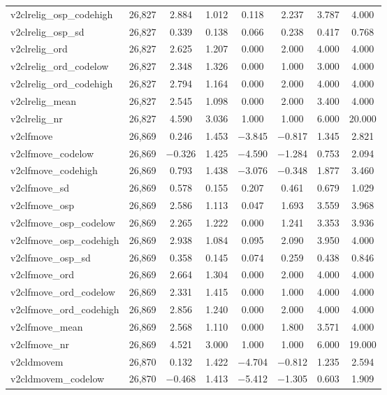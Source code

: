 \begin{table}[!htbp]
\begin{tabular}{@{\extracolsep{5pt}}lccccccc}
v2clrelig\_osp\_codehigh & 26,827 & 2.884 & 1.012 & 0.118 & 2.237 & 3.787 & 4.000 \\ 
v2clrelig\_osp\_sd & 26,827 & 0.339 & 0.138 & 0.066 & 0.238 & 0.417 & 0.768 \\ 
v2clrelig\_ord & 26,827 & 2.625 & 1.207 & 0.000 & 2.000 & 4.000 & 4.000 \\ 
v2clrelig\_ord\_codelow & 26,827 & 2.348 & 1.326 & 0.000 & 1.000 & 3.000 & 4.000 \\ 
v2clrelig\_ord\_codehigh & 26,827 & 2.794 & 1.164 & 0.000 & 2.000 & 4.000 & 4.000 \\ 
v2clrelig\_mean & 26,827 & 2.545 & 1.098 & 0.000 & 2.000 & 3.400 & 4.000 \\ 
v2clrelig\_nr & 26,827 & 4.590 & 3.036 & 1.000 & 1.000 & 6.000 & 20.000 \\ 
v2clfmove & 26,869 & 0.246 & 1.453 & $-$3.845 & $-$0.817 & 1.345 & 2.821 \\ 
v2clfmove\_codelow & 26,869 & $-$0.326 & 1.425 & $-$4.590 & $-$1.284 & 0.753 & 2.094 \\ 
v2clfmove\_codehigh & 26,869 & 0.793 & 1.438 & $-$3.076 & $-$0.348 & 1.877 & 3.460 \\ 
v2clfmove\_sd & 26,869 & 0.578 & 0.155 & 0.207 & 0.461 & 0.679 & 1.029 \\ 
v2clfmove\_osp & 26,869 & 2.586 & 1.113 & 0.047 & 1.693 & 3.559 & 3.968 \\ 
v2clfmove\_osp\_codelow & 26,869 & 2.265 & 1.222 & 0.000 & 1.241 & 3.353 & 3.936 \\ 
v2clfmove\_osp\_codehigh & 26,869 & 2.938 & 1.084 & 0.095 & 2.090 & 3.950 & 4.000 \\ 
v2clfmove\_osp\_sd & 26,869 & 0.358 & 0.145 & 0.074 & 0.259 & 0.438 & 0.846 \\ 
v2clfmove\_ord & 26,869 & 2.664 & 1.304 & 0.000 & 2.000 & 4.000 & 4.000 \\ 
v2clfmove\_ord\_codelow & 26,869 & 2.331 & 1.415 & 0.000 & 1.000 & 4.000 & 4.000 \\ 
v2clfmove\_ord\_codehigh & 26,869 & 2.856 & 1.240 & 0.000 & 2.000 & 4.000 & 4.000 \\ 
v2clfmove\_mean & 26,869 & 2.568 & 1.110 & 0.000 & 1.800 & 3.571 & 4.000 \\ 
v2clfmove\_nr & 26,869 & 4.521 & 3.000 & 1.000 & 1.000 & 6.000 & 19.000 \\ 
v2cldmovem & 26,870 & 0.132 & 1.422 & $-$4.704 & $-$0.812 & 1.235 & 2.594 \\ 
v2cldmovem\_codelow & 26,870 & $-$0.468 & 1.413 & $-$5.412 & $-$1.305 & 0.603 & 1.909 \\ 

\end{tabular}
\end{table}
